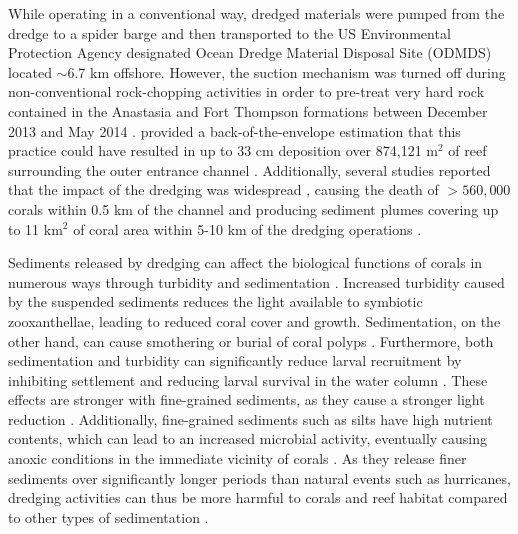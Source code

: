 While operating in a conventional way, dredged materials were pumped from the dredge to a spider barge and then transported to the US Environmental Protection Agency designated Ocean Dredge Material Disposal Site (ODMDS) located $\sim$6.7 km offshore. However, the suction mechanism was turned off during non-conventional rock-chopping activities in order to pre-treat very hard rock contained in the Anastasia and Fort Thompson formations between December 2013 and May 2014 \citep{miller2016detecting}. \cite{usace2017} provided a back-of-the-envelope estimation that this practice could have resulted in up to 33 cm deposition over 874,121 m$^2$ of reef surrounding the outer entrance channel . Additionally, several studies reported that the impact of the dredging was widespread \citep{miller2016detecting}, causing the death of  $> 560,000$ corals within 0.5 km of the channel \citep{cunning2019extensive} and producing sediment plumes covering up to 11 km$^2$ of coral area within 5-10 km of the dredging operations \citep{barnes2015sediment}.

Sediments released by dredging can affect the biological functions of corals in numerous ways  through turbidity and sedimentation \citep{erftemeijer2012environmental,jones2015effects}. Increased turbidity caused by the suspended sediments reduces the light available to symbiotic zooxanthellae, leading to reduced coral cover and growth. Sedimentation, on the other hand, can cause smothering or burial of coral polyps \citep{erftemeijer2012environmental,jones2015effects,jones2019sediment}. Furthermore, both sedimentation and turbidity can significantly reduce larval recruitment by inhibiting settlement and reducing larval survival in the water column \citep{jones2015effects}. These effects are stronger with fine-grained sediments, as they cause a stronger light reduction \citep{storlazzi2015influence,fourney2017additive}. Additionally, fine-grained sediments such as silts have high nutrient contents, which can lead to an increased microbial activity, eventually causing anoxic conditions in the immediate vicinity of corals \citep{weber2012mechanisms}. As they release finer sediments over significantly longer periods than natural events such as hurricanes, dredging activities can thus be more harmful to corals and reef habitat compared to other types of sedimentation \citep{cunning2019extensive}.

